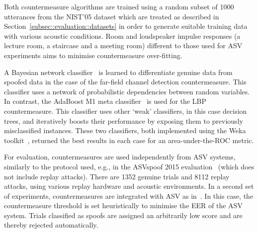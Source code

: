 Both countermeasure algorithms are trained using a random subset of 1000 utterances from the NIST'05 dataset which are treated as described in Section~\ref{subsec::evaluation::datasets} in order to generate suitable training data with various acoustic conditions. 
Room and loudspeaker impulse responses (a lecture room, a staircase and a meeting room) different to those used for ASV experiments aims to minimise countermeasure over-fitting.

A Bayesian network classifier~\cite{Pearl1988} is learned to differentiate genuine data from spoofed data in the case of the far-field channel detection countermeasure.  This classifier uses a network of probabilistic dependencies between random variables.  In contrast, the AdaBoost M1 meta classifier~\cite{Freund1999} is used for the LBP countermeasure.  This classifier  uses other `weak' classifiers, in this case decision trees, and iteratively boosts their performance by exposing them to previously misclassified instances.  These two classifiers, both implemented using the Weka toolkit~\cite{Weka}, returned the best results in each case for an area-under-the-ROC metric. %


For evaluation, countermeasures are used independently from ASV systems, similarly to the protocol used, e.g., in the ASVspoof 2015 evaluation~\cite{Wu2015} (which does not include replay attacks).  There are 1352 genuine trials and 8112 replay attacks, using various replay hardware and acoustic environments.  
In a second set of experiments, countermeasures are integrated with ASV as in~\cite{Alegre2013a}. In this case, the countermeasure threshold is set heuristically to minimise the EER of the ASV system. Trials classified as spoofs are assigned an arbitrarily low score and are thereby rejected automatically.

